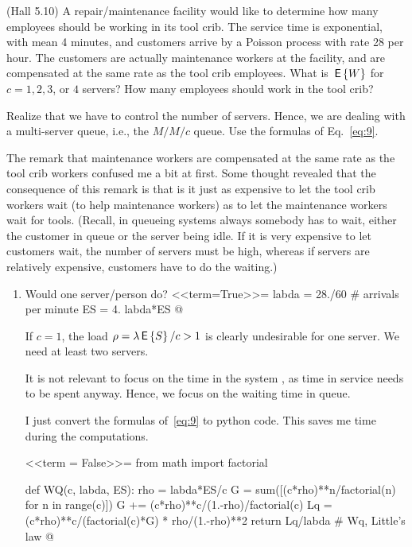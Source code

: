 \begin{exercise}
  (Hall 5.10) A repair/maintenance facility would like to determine
  how many employees should be working in its tool crib. The service
  time is exponential, with mean 4 minutes, and customers arrive by a
  Poisson process with rate 28 per hour. The customers are actually
  maintenance workers at the facility, and are compensated at the same
  rate as the tool crib employees.
 What is $\,\mathsf{E}\left\{W\right\}$ for $c=1, 2, 3$, or $4$ servers? How many employees should work in the tool crib?
  \begin{hint}
Realize that we have to control the number of servers. Hence,
    we are dealing with a multi-server queue, i.e., the $M/M/c$
    queue. Use the formulas of Eq.~\eqref{eq:9}.

The remark that maintenance workers are compensated at the same rate
as the tool crib workers confused me a bit at first.  Some thought
revealed that the consequence of this remark is that is it just as
expensive to let the tool crib workers wait (to help maintenance
workers) as to let the maintenance workers wait for tools. (Recall, in
queueing systems always somebody has to wait, either the customer in queue or
the server being idle. If it is very expensive to let customers wait, the number
of servers must be high, whereas if servers are relatively expensive, customers have to do the waiting.)
  \end{hint}
  \begin{solution}
    \begin{enumerate}
    \item 
      Would one server/person do? 
<<term=True>>=
labda = 28./60 # arrivals per minute
ES = 4.
labda*ES
@ 

If $c=1$, the load $\rho=\lambda \,\mathsf{E}\left\{S\right\}/c >1$ is clearly undesirable for one server.  We need at
least two servers.

It is not relevant to focus on the time in the system , as time
  in service needs to be spent anyway. Hence, we focus on the waiting
  time in queue.


I just convert the formulas of~\eqref{eq:9} to python code. This saves
me time during the computations.

<<term = False>>=
from math import factorial

def WQ(c, labda, ES):
    rho = labda*ES/c
    G = sum([(c*rho)**n/factorial(n) for n in range(c)])
    G += (c*rho)**c/(1.-rho)/factorial(c)
    Lq = (c*rho)**c/(factorial(c)*G) * rho/(1.-rho)**2
    return Lq/labda # Wq, Little's law
@ 


\end{enumerate}
\end{solution}
\end{exercise}
